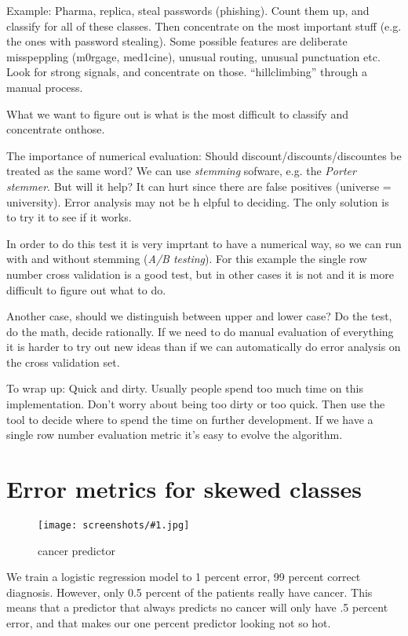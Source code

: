 \documentclass[a4, 12pt, english, USenglish]{scrreprt}
\newcommand{\screenshot}[2]{
\begin{figure}[htb]
\texttt{[image: screenshots/\#1.jpg]}
\label{#1}
\caption{#2}
\end{figure}}
\newcommand{\idx}[1]{{\em #1}\index{#1}}
\begin{document}
Example: Pharma, replica, steal passwords (phishing).   Count them
up, and classify for all of these classes.   Then concentrate on the
most important stuff (e.g. the ones with password stealing).  Some
possible features are deliberate misspeppling (m0rgage, med1cine),
unusual routing, unusual punctuation etc.  Look for strong signals,
and concentrate on those.  ``hillclimbing'' through a manual process.

What we  want to figure out is what is the most difficult to
classify and concentrate onthose.


The importance of numerical evaluation:  Should
discount/discounts/discountes be treated as the same word?    We can
use \idx{stemming} sofware, e.g. the \idx{Porter stemmer}.   But will
it help?   It can hurt since there are false positives (universe =
university).  Error analysis may not be h elpful to deciding.  The
only solution is to try it to see if it works.

In order to do this test it is very imprtant to have a numerical way,
so we can run with and without stemming (\idx{A/B testing}).   For
this example the single row number cross validation is a good test,
but in other cases it is not and it is more difficult to figure out
what to do.

Another case, should we distinguish between upper and lower case?   Do
the test, do the math, decide rationally.   If we need to do manual
evaluation of everything it is harder to try out new ideas than if we
can automatically do error analysis on the cross validation set.

To wrap up: Quick and dirty. Usually people spend too much time on
this implementation.  Don't worry about being too dirty or too quick.
Then use the tool to decide where to spend the time on further
development.  If we have a single row number evaluation metric it's
easy to evolve the algorithm.


\section{Error metrics for skewed classes}

\screenshot{cancerpredictor}{cancer predictor}

We train a logistic regression model to 1 percent error, 99 percent
correct diagnosis. However, only 0.5 percent of the patients really
have cancer.  This means that a predictor that always predicts no
cancer will only have .5 percent error, and that makes our one percent
predictor looking not so hot.
\end{document}
